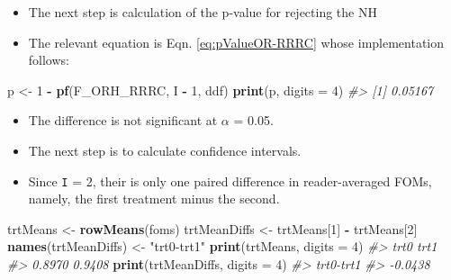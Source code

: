 \documentclass[
]{book}
\newenvironment{Shaded}{\begin{snugshade}}{\end{snugshade}}
\newcommand{\CommentTok}[1]{\textcolor[rgb]{0.56,0.35,0.01}{\textit{#1}}}
\newcommand{\DataTypeTok}[1]{\textcolor[rgb]{0.13,0.29,0.53}{#1}}
\newcommand{\DecValTok}[1]{\textcolor[rgb]{0.00,0.00,0.81}{#1}}
\newcommand{\KeywordTok}[1]{\textcolor[rgb]{0.13,0.29,0.53}{\textbf{#1}}}
\newcommand{\NormalTok}[1]{#1}
\newcommand{\OperatorTok}[1]{\textcolor[rgb]{0.81,0.36,0.00}{\textbf{#1}}}
\newcommand{\StringTok}[1]{\textcolor[rgb]{0.31,0.60,0.02}{#1}}
\providecommand{\tightlist}{%
  \setlength{\itemsep}{0pt}\setlength{\parskip}{0pt}}
\begin{document}
\begin{itemize}
\tightlist
\item
  The next step is calculation of the p-value for rejecting the NH
\item
  The relevant equation is Eqn. \eqref{eq:pValueOR-RRRC} whose implementation follows:
\end{itemize}

\begin{Shaded}
\begin{Highlighting}[]
\NormalTok{p \textless{}{-}}\StringTok{ }\DecValTok{1} \OperatorTok{{-}}\StringTok{ }\KeywordTok{pf}\NormalTok{(F\_ORH\_RRRC, I }\OperatorTok{{-}}\StringTok{ }\DecValTok{1}\NormalTok{, ddf)}
\KeywordTok{print}\NormalTok{(p, }\DataTypeTok{digits =} \DecValTok{4}\NormalTok{)}
\CommentTok{\#\textgreater{} [1] 0.05167}
\end{Highlighting}
\end{Shaded}

\begin{itemize}
\tightlist
\item
  The difference is not significant at \(\alpha\) = 0.05.
\item
  The next step is to calculate confidence intervals.
\item
  Since \texttt{I} = 2, their is only one paired difference in reader-averaged FOMs, namely, the first treatment minus the second.
\end{itemize}

\begin{Shaded}
\begin{Highlighting}[]
\NormalTok{trtMeans \textless{}{-}}\StringTok{ }\KeywordTok{rowMeans}\NormalTok{(foms)}
\NormalTok{trtMeanDiffs \textless{}{-}}\StringTok{ }\NormalTok{trtMeans[}\DecValTok{1}\NormalTok{] }\OperatorTok{{-}}\StringTok{ }\NormalTok{trtMeans[}\DecValTok{2}\NormalTok{]}
\KeywordTok{names}\NormalTok{(trtMeanDiffs) \textless{}{-}}\StringTok{ "trt0{-}trt1"}
\KeywordTok{print}\NormalTok{(trtMeans, }\DataTypeTok{digits =} \DecValTok{4}\NormalTok{)}
\CommentTok{\#\textgreater{}   trt0   trt1 }
\CommentTok{\#\textgreater{} 0.8970 0.9408}
\KeywordTok{print}\NormalTok{(trtMeanDiffs, }\DataTypeTok{digits =} \DecValTok{4}\NormalTok{)}
\CommentTok{\#\textgreater{} trt0{-}trt1 }
\CommentTok{\#\textgreater{}   {-}0.0438}
\end{Highlighting}
\end{Shaded}
\end{document}
